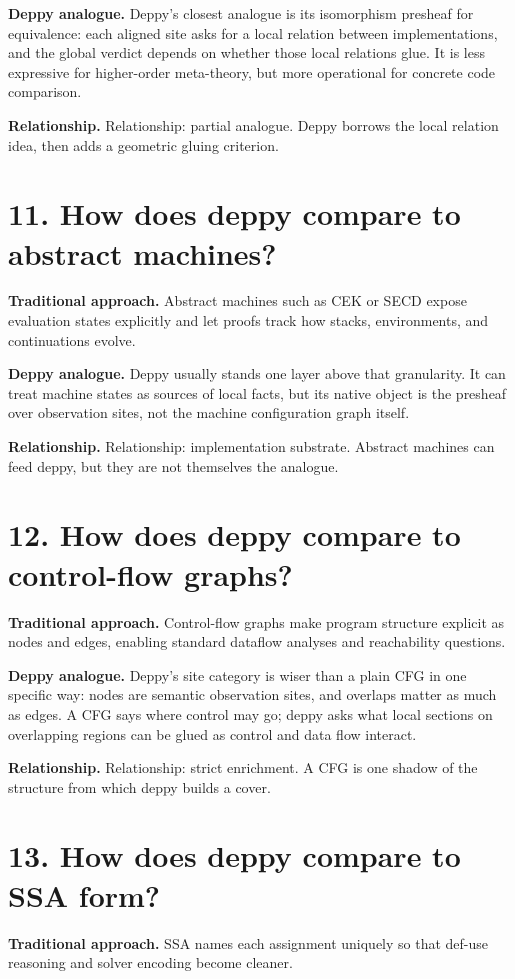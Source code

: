 \documentclass[11pt,openany]{book}
\begin{document}
\textbf{Deppy analogue.} Deppy's closest analogue is its isomorphism presheaf for equivalence: each aligned site asks for a local relation between implementations, and the global verdict depends on whether those local relations glue. It is less expressive for higher-order meta-theory, but more operational for concrete code comparison.

\textbf{Relationship.} Relationship: partial analogue. Deppy borrows the local relation idea, then adds a geometric gluing criterion.

\section*{11. How does deppy compare to abstract machines?}
\textbf{Traditional approach.} Abstract machines such as CEK or SECD expose evaluation states explicitly and let proofs track how stacks, environments, and continuations evolve.

\textbf{Deppy analogue.} Deppy usually stands one layer above that granularity. It can treat machine states as sources of local facts, but its native object is the presheaf over observation sites, not the machine configuration graph itself.

\textbf{Relationship.} Relationship: implementation substrate. Abstract machines can feed deppy, but they are not themselves the analogue.

\section*{12. How does deppy compare to control-flow graphs?}
\textbf{Traditional approach.} Control-flow graphs make program structure explicit as nodes and edges, enabling standard dataflow analyses and reachability questions.

\textbf{Deppy analogue.} Deppy's site category is wiser than a plain CFG in one specific way: nodes are semantic observation sites, and overlaps matter as much as edges. A CFG says where control may go; deppy asks what local sections on overlapping regions can be glued as control and data flow interact.

\textbf{Relationship.} Relationship: strict enrichment. A CFG is one shadow of the structure from which deppy builds a cover.

\section*{13. How does deppy compare to SSA form?}
\textbf{Traditional approach.} SSA names each assignment uniquely so that def-use reasoning and solver encoding become cleaner.
\end{document}
